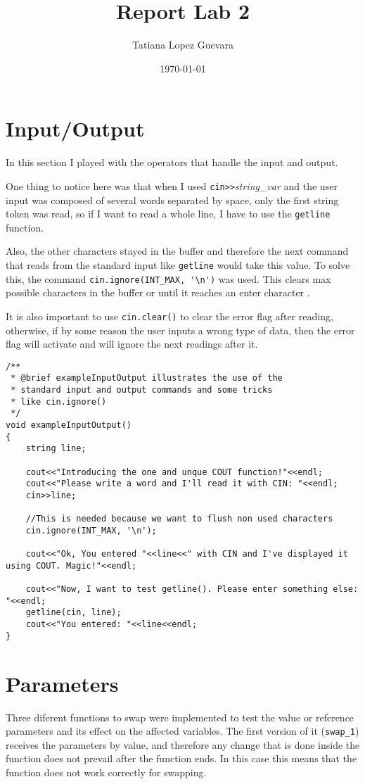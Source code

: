 \documentclass{article}
\begin{document}
\title{Report Lab 2}
\date {\today}
\author{Tatiana Lopez Guevara}
\maketitle

\section{Input/Output}
In this section I played with the operators that 
handle the input and output. 

One thing to notice here
was that when I used \verb+cin>>+\textit{string\_var} 
and the user input was composed of several words separated
by space, only the first string token was read, so if I want
to read a whole line, I have to use the \verb+getline+ function.

Also, the other characters stayed in the buffer and therefore
the next command that reads from the standard input like \verb+getline+ 
would take this value. To solve this, the command \verb+cin.ignore(INT_MAX, '\n')+
was used. This clears max possible characters in the buffer or until it 
reaches an enter character \cite{stack1}.

It is also important to use \verb+cin.clear()+ to clear the error flag
after reading, otherwise, if by some reason the user inputs a wrong
type of data, then the error flag will activate and will ignore
the next readings after it.

\begin{lstlisting}[label=lst_inout,caption=Input]
/**
 * @brief exampleInputOutput illustrates the use of the
 * standard input and output commands and some tricks
 * like cin.ignore()
 */
void exampleInputOutput()
{
	string line;

	cout<<"Introducing the one and unque COUT function!"<<endl;
	cout<<"Please write a word and I'll read it with CIN: "<<endl;
	cin>>line;

	//This is needed because we want to flush non used characters
	cin.ignore(INT_MAX, '\n');

	cout<<"Ok, You entered "<<line<<" with CIN and I've displayed it using COUT. Magic!"<<endl;

	cout<<"Now, I want to test getline(). Please enter something else: "<<endl;
	getline(cin, line);
	cout<<"You entered: "<<line<<endl;
}
\end{lstlisting} 

\section{Parameters}
Three diferent functions to swap were implemented to test the value
or reference parameters and its effect on the affected variables.
The first version of it (\verb+swap_1+) 
receives the parameters by value, and therefore
any change that is done inside the function does not prevail after 
the function ends. In this case this means that the function does
not work correctly for swapping.
\end{document}
